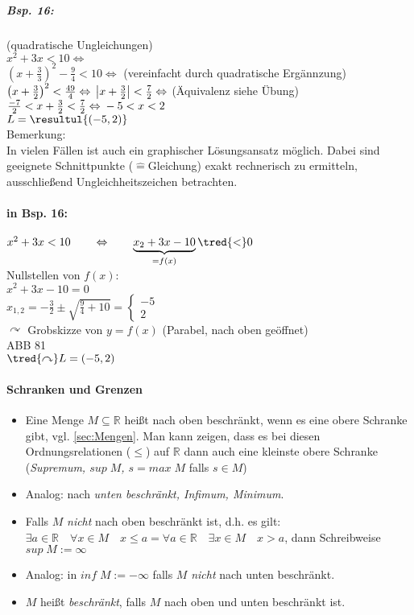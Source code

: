 \subparagraph{Bsp. 16:} (quadratische Ungleichungen)\\
$x^2+3x<10 \Leftrightarrow$ \\
$\left( x+\frac{3}{3}\right)^2-\frac{9}{4}<10 \Leftrightarrow$ (vereinfacht durch quadratische Ergännzung)\\
$\left( x+\frac{3}{2}\right)^2<\frac{49}{4} \Leftrightarrow\\
\left|x+\frac{3}{2}\right|<\frac{7}{2} \Leftrightarrow$ (Äquivalenz siehe Übung) \\
$\frac{-7}{2}<x+\frac{3}{2}<\frac{7}{2} \Leftrightarrow\\
-5<x<2$\\
$L=\resultul{(-5,2)}$\medskip\\
Bemerkung:\\
In vielen Fällen ist auch ein graphischer Lösungsansatz möglich. Dabei sind geeignete Schnittpunkte ($\widehat{=}$Gleichung) exakt rechnerisch zu ermitteln, ausschließend Ungleichheitszeichen betrachten.

\paragraph{in Bsp. 16:} \parskp
$x^2+3x<10 \qquad \Leftrightarrow \qquad \underbrace{x_2+3x-10}_{=f(x)}\tred{<}0$\\
Nullstellen von $f(x)$: \\
$x^2+3x-10=0$\\
$x_{1,2}=-\frac{3}{2}\pm \sqrt{\frac{9}{4}+10}=\begin{cases}
-5\\
2
\end{cases}$\\
$\curvearrowright$ Grobskizze von $y=f(x)$ (Parabel, nach oben geöffnet)\\
ABB 81\\
$\tred{\curvearrowright} L=(-5,2)$

\paragraph{Schranken und Grenzen}
\begin{itemize}
\item Eine Menge $M\subseteq \mathbb{R}$ heißt nach oben beschränkt, wenn es eine obere Schranke gibt, vgl. \ref{sec:Mengen}. Man kann zeigen, dass es bei diesen Ordnungsrelationen ($\leq$) auf $\mathbb{R}$ dann auch eine kleinste obere Schranke (\emph{Supremum, $sup\;M$, $s=max \; M$} falls $s \in M$)
\item Analog: nach \emph{unten beschränkt, Infimum, Minimum}.
\item Falls $M$ \emph{nicht} nach oben beschränkt ist, d.h. es gilt:\\
$\exists a \in \mathbb{R}\quad \forall x \in M\quad x \leq a = \forall a \in \mathbb{R} \quad \exists x \in M \quad x >a$, dann Schreibweise $\boxed{sup\; M := \infty}$
\item Analog: in $\boxed{inf\; M:= - \infty}$ falls $M$ \emph{nicht} nach unten beschränkt.
\item $M$ heißt \emph{beschränkt}, falls $M$ nach oben und unten beschränkt ist.
\end{itemize} 

